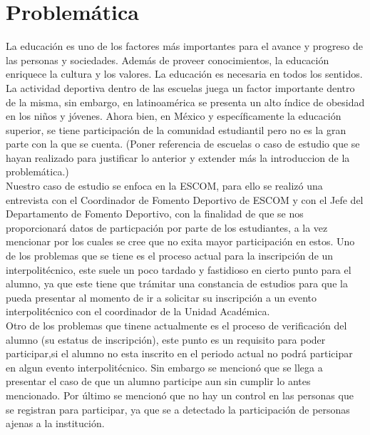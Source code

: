 \section{Problem\'atica}
\noindent La educación es uno de los factores más importantes para el avance y progreso de las personas y sociedades. Además de proveer conocimientos, la educación enriquece la cultura y los valores. La educación es necesaria en todos los sentidos.\\
La actividad deportiva dentro de las escuelas juega un factor importante dentro de la misma, sin embargo, en latinoamérica se presenta un alto índice de obesidad en los niños y jóvenes.  \cite{problemas}  Ahora bien, en México y específicamente la educación superior, se tiene participación de la comunidad estudiantil pero no es la gran parte con la que se cuenta. 
(Poner referencia de escuelas o caso de estudio que se hayan realizado para justificar lo anterior y extender más la introduccion de la problemática.)\\
Nuestro caso de estudio se enfoca en la ESCOM, para ello se realizó una entrevista con el Coordinador de Fomento Deportivo de ESCOM y con el Jefe del Departamento de Fomento Deportivo, con la finalidad de que se nos proporcionará datos de particpación por parte de los estudiantes, a la vez mencionar por los cuales se cree que no exita mayor participación en estos. Uno de los problemas que se tiene es el proceso actual para la inscripción de un interpolitécnico, este suele un poco tardado y fastidioso en cierto punto para el alumno, ya que este tiene que trámitar una constancia de estudios para que la pueda presentar al momento de ir a solicitar su inscripción a un evento interpolitécnico con el coordinador de la Unidad Académica.\\
Otro de los problemas que tinene actualmente es el proceso de verificación del alumno (su estatus de inscripción), este punto es un requisito para poder participar,si el alumno no esta inscrito en el periodo actual no podrá participar en algun evento interpolitécnico. Sin embargo se mencionó que se llega a presentar el caso de que un alumno participe aun sin cumplir lo antes mencionado.
Por último se mencionó que no hay un control en las personas que se registran para participar, ya que se a detectado la participación de personas ajenas a la institución. 



